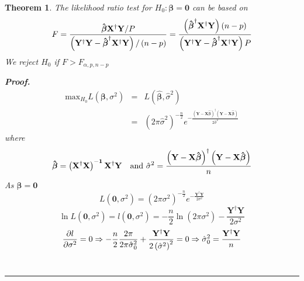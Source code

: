 \documentclass{article}
\newtheorem{theorem}{Theorem}
\newenvironment{proof}[1][Proof]{\noindent\textbf{#1.} }{\ \rule{0.5em}{0.5em}}
\begin{document}
\bigskip

\begin{theorem}
The likelihood ratio test for $H_{0}:\mathbf{\beta =0}$ can be based on%
\begin{equation*}
F=\frac{\mathbf{\hat{\beta}X^{\dagger }Y}/P}{\left( \mathbf{Y^{\dagger }Y}-%
\mathbf{\hat{\beta}}^{\dagger }\mathbf{X^{\dagger }Y}\right) /\left(
n-p\right) }=\frac{\left( \mathbf{\hat{\beta}}^{\dagger }\mathbf{X^{\dagger
}Y}\right) \left( n-p\right) }{\left( \mathbf{Y^{\dagger }Y}-\mathbf{\hat{%
\beta}}^{\dagger }\mathbf{X^{\dagger }Y}\right) P}
\end{equation*}%
We reject $H_{0}$ if $F>F_{\alpha ,p,n-p}$

\begin{proof}
\begin{eqnarray*}
\text{max}_{H_{0}}L\left( \mathbf{\beta },\sigma ^{2}\right)  &=&L\left( 
\mathbf{\hat{\beta}},\hat{\sigma}^{2}\right)  \\
&=&\left( 2\pi \hat{\sigma}^{2}\right) ^{-\frac{n}{2}}e^{-\frac{\left( 
\mathbf{Y-X\hat{\beta}}\right) ^{\dagger }\left( \mathbf{Y-X\hat{\beta}}%
\right) }{2\hat{\sigma}^{2}}}
\end{eqnarray*}%
where%
\begin{equation*}
\mathbf{\hat{\beta}}=\mathbf{\left( \mathbf{X}^{\dagger }\mathbf{X}\right)
^{-1}X^{\dagger }Y}\text{ and }\hat{\sigma}^{2}=\frac{\left( \mathbf{Y-X\hat{%
\beta}}\right) ^{\dagger }\left( \mathbf{Y-X\hat{\beta}}\right) }{n}
\end{equation*}%
As $\mathbf{\beta }=\mathbf{0}$%
\begin{equation*}
L\left( \mathbf{0},\sigma ^{2}\right) =\left( 2\pi \sigma ^{2}\right) ^{-%
\frac{n}{2}}e^{-\frac{\mathbf{Y}^{\dagger }\mathbf{Y}}{2\sigma ^{2}}}
\end{equation*}%
\begin{equation*}
\ln L\left( \mathbf{0},\sigma ^{2}\right) =l\left( \mathbf{0},\sigma
^{2}\right) =-\frac{n}{2}\ln \left( 2\pi \sigma ^{2}\right) -\frac{\mathbf{Y}%
^{\dagger }\mathbf{Y}}{2\sigma ^{2}}
\end{equation*}%
\begin{equation*}
\frac{\partial l}{\partial \sigma ^{2}}=0\Rightarrow -\frac{n}{2}\frac{2\pi 
}{2\pi \hat{\sigma}_{0}^{2}}+\frac{\mathbf{Y}^{\dagger }\mathbf{Y}}{2\left( 
\hat{\sigma}^{2}\right) ^{2}}=0\Rightarrow \hat{\sigma}_{0}^{2}=\frac{%
\mathbf{Y}^{\dagger }\mathbf{Y}}{n}
\end{equation*}%
\begin{equation*}

\end{equation*}
\end{proof}
\end{theorem}
\end{document}
